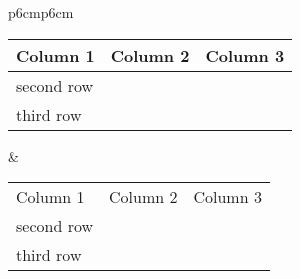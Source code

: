 \documentclass{article}
\begin{document}
\begin{tabular}{p{6cm}p{6cm}}
           \def\rulecolor#1#{\CT@arc{#1}}
           \def\CT@arc#1#2{%
           \ifdim\baselineskip=\z@\noalign\fi
           {\gdef\CT@arc@{\color#1{#2}}}}
           \let\CT@arc@\relax
        \makeatother
        \begin{tabular}{@{}lll@{}}
        \toprule
        Column 1 & Column 2 & Column 3 \\
        \midrule
        second row & & \\
        third row & & \\
        \bottomrule
        \end{tabular}
       &
        \begin{tabular}{@{}lll@{}}
        \toprule
        Column 1 & Column 2 & Column 3 \\
        \cmidrule(r){1-1}\cmidrule(lr){2-2}\cmidrule(l){3-3}
        second row & & \\
        third row & & \\
        \bottomrule
        \end{tabular}
   \end{tabular}
\end{document}
